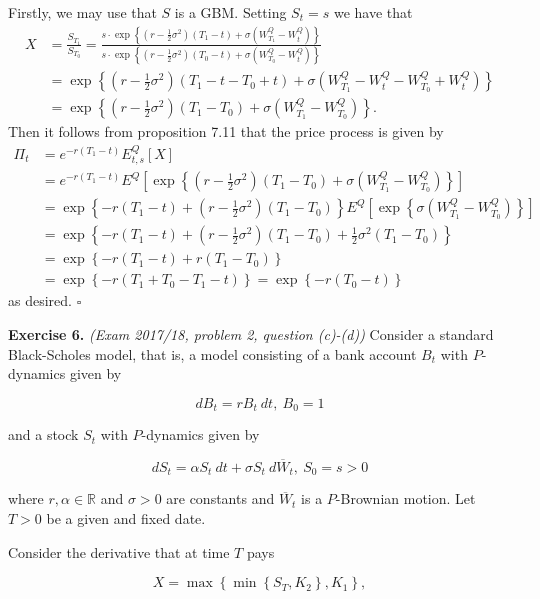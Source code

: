 \documentclass[a4paper,12pt,openany]{book}
\begin{document}
Firstly, we may use that \(S\) is a GBM. Setting \(S_t=s\) we have that
\begin{align*}
X&=\frac{S_{T_1}}{S_{T_0}}=\frac{s\cdot \exp\left\{\left(r-\frac{1}{2}\sigma^2\right)(T_1-t) +\sigma\left(W_{T_1}^Q-W_t^Q\right)\right\}}{s\cdot \exp\left\{\left(r-\frac{1}{2}\sigma^2\right)(T_0-t) +\sigma\left(W_{T_0}^Q-W_t^Q\right)\right\}}\\
&=\exp\left\{\left(r-\frac{1}{2}\sigma^2\right)(T_1-t-T_0+t) +\sigma\left(W_{T_1}^Q-W_t^Q-W_{T_0}^Q+W_t^Q\right)\right\}\\
&=\exp\left\{\left(r-\frac{1}{2}\sigma^2\right)(T_1-T_0) +\sigma\left(W_{T_1}^Q-W_{T_0}^Q\right)\right\}.
\end{align*}
Then it follows from proposition 7.11 that the price process is given by
\begin{align*}
\Pi_t&=e^{-r(T_1-t)}E^Q_{t,s}[X]\\
&=e^{-r(T_1-t)}E^Q\left[\exp\left\{\left(r-\frac{1}{2}\sigma^2\right)(T_1-T_0) +\sigma\left(W_{T_1}^Q-W_{T_0}^Q\right)\right\}\right]\\
&=\exp\left\{-r(T_1-t)+\left(r-\frac{1}{2}\sigma^2\right)(T_1-T_0)\right\}E^Q\left[\exp\left\{\sigma\left(W_{T_1}^Q-W_{T_0}^Q\right)\right\}\right]\\
&=\exp\left\{-r(T_1-t)+\left(r-\frac{1}{2}\sigma^2\right)(T_1-T_0)+\frac{1}{2}\sigma^2(T_1-T_0)\right\}\\
&=\exp\left\{-r(T_1-t)+r(T_1-T_0)\right\}\\
&=\exp\left\{-r(T_1+T_0-T_1-t)\right\}=\exp\left\{-r(T_0-t)\right\}
\end{align*}
as desired. \(\square\)

\textbf{Exercise 6.} \emph{(Exam 2017/18, problem 2, question (c)-(d))} Consider a standard Black-Scholes model, that is, a model consisting of a bank account \(B_t\) with \(P\)-dynamics given by

\[
dB_t=rB_t\ dt,\ B_0=1
\]

and a stock \(S_t\) with \(P\)-dynamics given by

\[
dS_t=\alpha S_t\ dt+\sigma S_t\ d\overline{W}_t,\ S_0=s>0
\]

where \(r,\alpha\in\mathbb{R}\) and \(\sigma >0\) are constants and \(\overline{W}_t\) is a \(P\)-Brownian motion. Let \(T>0\) be a given and fixed date.

Consider the derivative that at time \(T\) pays

\[
X=\max\left\{\min\left\{S_T,K_2\right\},K_1\right\},
\]
\end{document}
